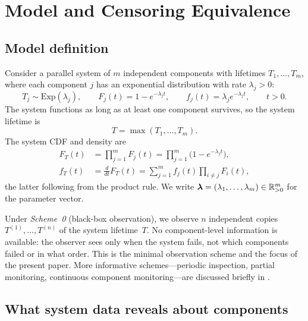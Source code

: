 \section{Model and Censoring Equivalence}
\label{sec:model}

\subsection{Model definition}
\label{sec:model-def}

Consider a parallel system of $m$ independent components with lifetimes
$T_1, \ldots, T_m$, where each component $j$ has an exponential distribution
with rate $\lambda_j > 0$:
\begin{equation}\label{eq:component-dist}
  T_j \sim \mathrm{Exp}(\lambda_j), \qquad
  F_j(t) = 1 - e^{-\lambda_j t}, \qquad
  f_j(t) = \lambda_j e^{-\lambda_j t}, \qquad t > 0.
\end{equation}
The system functions as long as at least one component survives, so the
system lifetime is
\begin{equation}\label{eq:system-lifetime}
  T = \max(T_1, \ldots, T_m).
\end{equation}
The system CDF and density are
\begin{align}
  F_T(t) &= \prod_{j=1}^m F_j(t) = \prod_{j=1}^m \bigl(1 - e^{-\lambda_j t}\bigr),
  \label{eq:system-cdf} \\
  f_T(t) &= \frac{d}{dt} F_T(t) = \sum_{j=1}^m f_j(t) \prod_{i \neq j} F_i(t),
  \label{eq:system-density}
\end{align}
the latter following from the product rule.  We write
$\boldsymbol{\lambda} = (\lambda_1, \ldots, \lambda_m) \in \mathbb{R}_{>0}^m$ for the parameter
vector.

Under \emph{Scheme~0} (black-box observation), we observe $n$ independent
copies $T^{(1)}, \ldots, T^{(n)}$ of the system lifetime~$T$.  No
component-level information is available: the observer sees only when the
system fails, not which components failed or in what order.  This is the
minimal observation scheme and the focus of the present paper.  More
informative schemes---periodic inspection, partial monitoring, continuous
component monitoring---are discussed briefly in .

\subsection{What system data reveals about components}
\label{sec:what-data-reveals}

